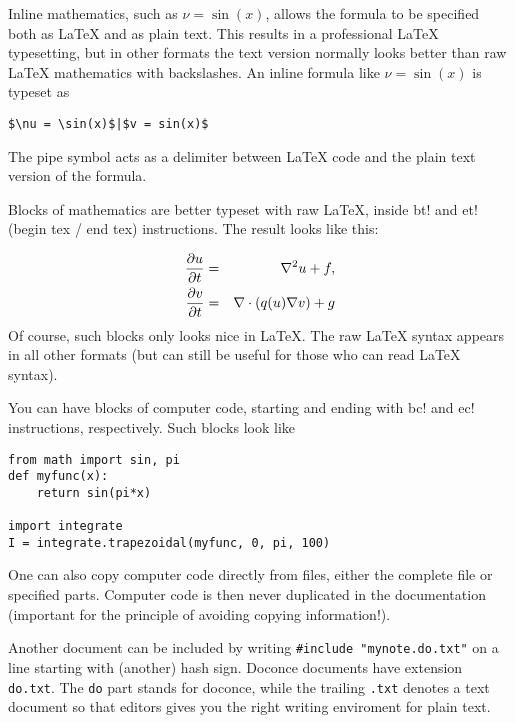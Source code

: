 \documentclass{article}
\begin{document}
Inline mathematics, such as $\nu = \sin(x)$,
allows the formula to be specified both as {\LaTeX} and as plain text.
This results in a professional {\LaTeX} typesetting, but in other formats
the text version normally looks better than raw {\LaTeX} mathematics with
backslashes. An inline formula like $\nu = \sin(x)$ is
typeset as
\begin{Verbatim}[fontsize=\fontsize{9pt}{9pt},tabsize=8,baselinestretch=0.85,
fontfamily=tt,xleftmargin=7mm]
$\nu = \sin(x)$|$v = sin(x)$
\end{Verbatim}
\noindent
The pipe symbol acts as a delimiter between {\LaTeX} code and the plain text
version of the formula.

Blocks of mathematics are better typeset with raw {\LaTeX}, inside
{\fontsize{10pt}{10pt}\verb!!bt!} and {\fontsize{10pt}{10pt}\verb!!et!} (begin tex / end tex) instructions. 
The result looks like this:

\begin{eqnarray}
{\partial u\over\partial t} &=& \nabla^2 u + f,\label{myeq1}\\
{\partial v\over\partial t} &=& \nabla\cdot(q(u)\nabla v) + g
\end{eqnarray}
Of course, such blocks only looks nice in {\LaTeX}. The raw
{\LaTeX} syntax appears in all other formats (but can still be useful
for those who can read {\LaTeX} syntax).

You can have blocks of computer code, starting and ending with
{\fontsize{10pt}{10pt}\verb!!bc!} and {\fontsize{10pt}{10pt}\verb!!ec!} instructions, respectively. Such blocks look like
\begin{Verbatim}[fontsize=\fontsize{9pt}{9pt},tabsize=8,baselinestretch=0.85,
fontfamily=tt,xleftmargin=7mm]
from math import sin, pi
def myfunc(x):
    return sin(pi*x)

import integrate
I = integrate.trapezoidal(myfunc, 0, pi, 100)
\end{Verbatim}
\noindent

One can also copy computer code directly from files, either the
complete file or specified parts.  Computer code is then never
duplicated in the documentation (important for the principle of
avoiding copying information!).

Another document can be included by writing {\fontsize{10pt}{10pt}\verb!#include "mynote.do.txt"!}
on a line starting with (another) hash sign.  Doconce documents have
extension {\fontsize{10pt}{10pt}\verb!do.txt!}. The {\fontsize{10pt}{10pt}\verb!do!} part stands for doconce, while the
trailing {\fontsize{10pt}{10pt}\verb!.txt!} denotes a text document so that editors gives you the
right writing enviroment for plain text.
\end{document}
